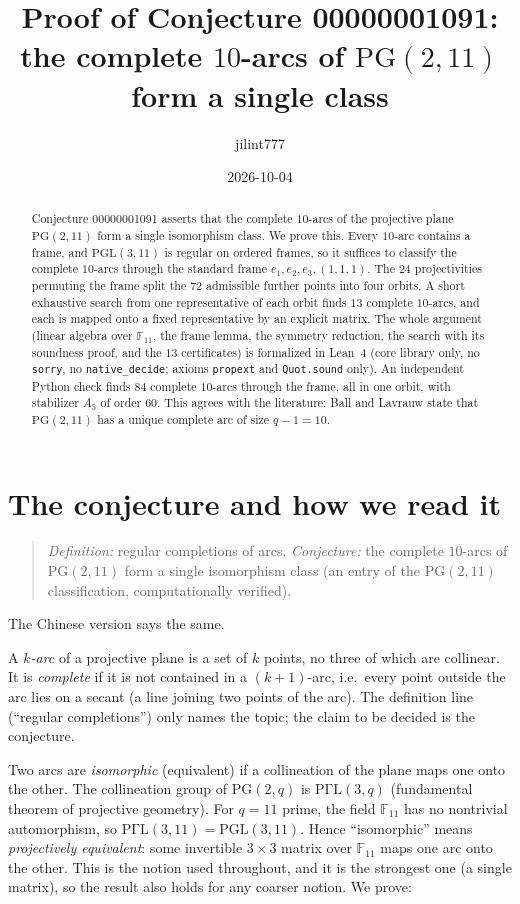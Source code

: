 \documentclass[11pt]{article}
\title{Proof of Conjecture 00000001091:\\
the complete $10$-arcs of $\mathrm{PG}(2,11)$ form a single class}
\author{jilint777}
\date{2026-10-04}
\theoremstyle{definition}
\theoremstyle{remark}
\newcommand{\F}{\mathbb{F}_{11}}
\newcommand{\PG}{\mathrm{PG}(2,11)}
\newcommand{\PGL}{\mathrm{PGL}(3,11)}
\begin{document}
\sloppy
\maketitle

\begin{abstract}
Conjecture 00000001091 asserts that the complete $10$-arcs of the projective
plane $\PG$ form a single isomorphism class. We prove this. Every $10$-arc
contains a frame, and $\PGL$ is regular on ordered frames, so it suffices to
classify the complete $10$-arcs through the standard frame
$e_1,e_2,e_3,(1,1,1)$. The $24$ projectivities permuting the frame split the
$72$ admissible further points into four orbits. A short exhaustive search
from one representative of each orbit finds $13$ complete $10$-arcs, and each
is mapped onto a fixed representative by an explicit matrix. The whole
argument (linear algebra over $\F$, the frame lemma, the symmetry reduction,
the search with its soundness proof, and the $13$ certificates) is formalized
in Lean~4 (core library only, no \texttt{sorry}, no \texttt{native\_decide};
axioms \texttt{propext} and \texttt{Quot.sound} only). An independent Python
check finds $84$ complete $10$-arcs through the frame, all in one orbit, with
stabilizer $A_5$ of order $60$. This agrees with the literature: Ball and
Lavrauw state that $\PG$ has a unique complete arc of size $q-1=10$.
\end{abstract}

\section{The conjecture and how we read it}
\begin{quote}
\emph{Definition:} regular completions of arcs.
\emph{Conjecture:} the complete $10$-arcs of $\PG$ form a single isomorphism
class (an entry of the $\PG$ classification, computationally verified).
\end{quote}
The Chinese version says the same.

A \emph{$k$-arc} of a projective plane is a set of $k$ points, no three of
which are collinear. It is \emph{complete} if it is not contained in a
$(k+1)$-arc, i.e.\ every point outside the arc lies on a secant (a line joining
two points of the arc). The definition line (``regular completions'') only
names the topic; the claim to be decided is the conjecture.

Two arcs are \emph{isomorphic} (equivalent) if a collineation of the plane maps
one onto the other. The collineation group of $\mathrm{PG}(2,q)$ is
$\mathrm{P\Gamma L}(3,q)$ (fundamental theorem of projective geometry). For
$q=11$ prime, the field $\F$ has no nontrivial automorphism, so
$\mathrm{P\Gamma L}(3,11)=\PGL$. Hence ``isomorphic'' means
\emph{projectively equivalent}: some invertible $3\times3$ matrix over $\F$
maps one arc onto the other. This is the notion used throughout, and it is the
strongest one (a single matrix), so the result also holds for any coarser
notion. We prove:
\end{document}
